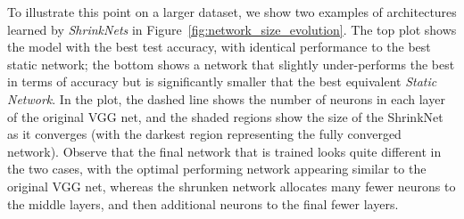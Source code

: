 To illustrate this point on a larger dataset, we show two examples of
architectures learned by \textit{ShrinkNets} in
Figure~\ref{fig:network_size_evolution}.  The top plot shows the model with the
best test accuracy, with identical performance to the best static
network; the bottom shows a network that slightly under-performs the best in
terms of accuracy but is significantly smaller that the best equivalent
\textit{Static Network}.  In the plot, the dashed line
shows the number of neurons in each layer of the original VGG net, and the
shaded regions show the size of the ShrinkNet as it converges (with the darkest
region representing the fully converged network).  Observe that the final
network that is trained looks quite different in the two cases, with the optimal
performing network appearing similar to the original VGG net, whereas the
shrunken network allocates many fewer neurons to the middle layers, and then
additional neurons to the final fewer layers.



